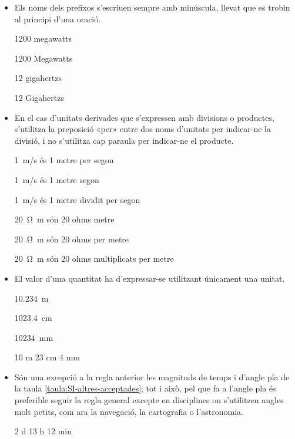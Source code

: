 \begin{itemize}
\textcolor{Red}\faTimesCircle{} 980 hecto-pascals


\item Els noms dels prefixos s'escriuen sempre amb minúscula, llevat que es trobin al principi d'una oració.

\textcolor{Green}\faCheckSquare{} 1200 megawatts

\textcolor{Red}\faTimesCircle{} 1200 Megawatts

\textcolor{Green}\faCheckSquare{} 12 gigahertzs

\textcolor{Red}\faTimesCircle{} 12 Gigahertzs


\item En el cas  d'unitats derivades que s'expressen amb divisions o
productes, s'utilitza la preposició «per» entre dos noms d'unitats
per indicar-ne la divisió, i no s'utilitza cap paraula per indicar-ne el
producte.

\textcolor{Green}\faCheckSquare{} \qty{1}{m/s} és 1 metre per segon

\textcolor{Red}\faTimesCircle{}  \qty{1}{m/s} és 1 metre segon

\textcolor{Red}\faTimesCircle{}  \qty{1}{m/s} és 1 metre dividit per segon

 \textcolor{Green}\faCheckSquare{} \qty{20}{\ohm.m} són 20 ohms metre

\textcolor{Red}\faTimesCircle{}   \qty{20}{\ohm.m} són 20 ohms  per metre

\textcolor{Red}\faTimesCircle{}   \qty{20}{\ohm.m} són 20 ohms multiplicats per metre


\item El valor d'una quantitat ha d'expressar-se  utilitzant únicament una unitat.

\textcolor{Green}\faCheckSquare{} \qty{10,234}{m}

\textcolor{Green}\faCheckSquare{} \qty{1023,4}{cm}

\textcolor{Green}\faCheckSquare{} \qty{10234}{mm}

\textcolor{Red}\faTimesCircle{}  10 m 23 cm 4 mm



\item Són una excepció a la regla anterior les magnituds de temps i d'angle pla de la taula \vref{taula:SI-altres-acceptades}; tot i això, pel que fa a l'angle pla és preferible seguir la regla general excepte en disciplines on s'utilitzen angles molt petits, com ara la navegació, la cartografia o l'astronomia.

\textcolor{Green}\faCheckSquare{} 2 d 13 h 12 min


\end{itemize}
